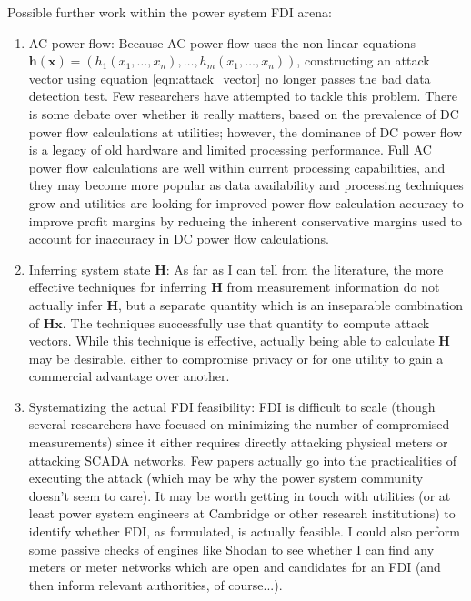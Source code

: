 \documentclass{article}
\begin{document}
Possible further work within the power system FDI arena:
\begin{enumerate}
    \item AC power flow:  Because AC power flow uses the non-linear equations $\mathbf{h(x)} = (h_1(x_1, \ldots, x_n), \ldots, h_m(x_1, \ldots, x_n))$, constructing an attack vector using equation \eqref{eqn:attack_vector} no longer passes the bad data detection test.  Few researchers have attempted to tackle this problem.  There is some debate over whether it really matters, based on the prevalence of DC power flow calculations at utilities; however, the dominance of DC power flow is a legacy of old hardware and limited processing performance.  Full AC power flow calculations are well within current processing capabilities, and they may become more popular as data availability and processing techniques grow and utilities are looking for improved power flow calculation accuracy to improve profit margins by reducing the inherent conservative margins used to account for inaccuracy in DC power flow calculations.
    \item Inferring system state $\mathbf{H}$:  As far as I can tell from the literature, the more effective techniques for inferring $\mathbf{H}$ from measurement information do not actually infer $\mathbf{H}$, but a separate quantity which is an inseparable combination of $\mathbf{Hx}$.  The techniques successfully use that quantity to compute attack vectors.  While this technique is effective, actually being able to calculate $\mathbf{H}$ may be desirable, either to compromise privacy or for one utility to gain a commercial advantage over another.
    \item Systematizing the actual FDI feasibility:  FDI is  difficult to scale (though several researchers have focused on minimizing the number of compromised measurements) since it either requires directly attacking physical meters or attacking SCADA networks.  Few papers actually go into the practicalities of executing the attack (which may be why the power system community doesn't seem to care).  It may be worth getting in touch with utilities (or at least power system engineers at Cambridge or other research institutions) to identify whether FDI, as formulated, is actually feasible.  I could also perform some passive checks of engines like Shodan to see whether I can find any meters or meter networks which are open and candidates for an FDI (and then inform relevant authorities, of course...).
\end{enumerate}
\end{document}
